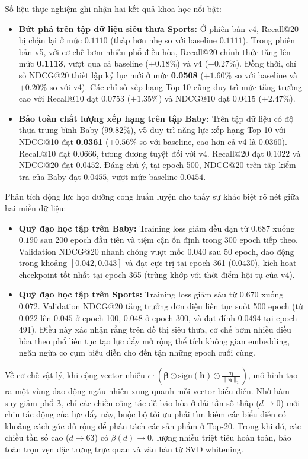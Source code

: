 Số liệu thực nghiệm ghi nhận hai kết quả khoa học nổi bật:
\begin{itemize}
    \item \textbf{Bứt phá trên tập dữ liệu siêu thưa Sports:} Ở phiên bản v4, Recall@20 bị chặn lại ở mức $0.1110$ (thấp hơn nhẹ so với baseline $0.1111$). Trong phiên bản v5, với cơ chế bơm nhiễu phổ điều hòa, Recall@20 chính thức tăng lên mức \textbf{0.1113}, vượt qua cả baseline ($+0.18\%$) và v4 ($+0.27\%$). Đồng thời, chỉ số NDCG@20 thiết lập kỷ lục mới ở mức \textbf{0.0508} ($+1.60\%$ so với baseline và $+0.20\%$ so với v4). Các chỉ số xếp hạng Top-10 cũng duy trì mức tăng trưởng cao với Recall@10 đạt $0.0753$ ($+1.35\%$) và NDCG@10 đạt $0.0415$ ($+2.47\%$).
    \item \textbf{Bảo toàn chất lượng xếp hạng trên tập Baby:} Trên tập dữ liệu có độ thưa trung bình Baby ($99.82\%$), v5 duy trì năng lực xếp hạng Top-10 với NDCG@10 đạt \textbf{0.0361} ($+0.56\%$ so với baseline, cao hơn cả v4 là $0.0360$). Recall@10 đạt $0.0666$, tương đương tuyệt đối với v4. Recall@20 đạt $0.1022$ và NDCG@20 đạt $0.0452$. Đáng chú ý, tại epoch 500, NDCG@20 trên tập kiểm tra của Baby đạt $0.0455$, vượt mức baseline $0.0454$.
\end{itemize}

Phân tích động lực học đường cong huấn luyện cho thấy sự khác biệt rõ nét giữa hai miền dữ liệu:
\begin{itemize}
    \item \textbf{Quỹ đạo học tập trên Baby:} Training loss giảm đều đặn từ $0.687$ xuống $0.190$ sau 200 epoch đầu tiên và tiệm cận ổn định trong 300 epoch tiếp theo. Validation NDCG@20 nhanh chóng vượt mốc $0.040$ sau 50 epoch, dao động trong khoảng $[0.042, 0.043]$ và đạt cực trị tại epoch 361 ($0.0430$), kích hoạt checkpoint tốt nhất tại epoch 365 (trùng khớp với thời điểm hội tụ của v4).
    \item \textbf{Quỹ đạo học tập trên Sports:} Training loss giảm sâu từ $0.670$ xuống $0.072$. Validation NDCG@20 tăng trưởng đơn điệu liên tục suốt 500 epoch (từ $0.022$ lên $0.045$ ở epoch 100, $0.048$ ở epoch 300, và đạt đỉnh $0.0494$ tại epoch 491). Điều này xác nhận rằng trên đồ thị siêu thưa, cơ chế bơm nhiễu điều hòa theo phổ liên tục tạo lực đẩy mở rộng thể tích không gian embedding, ngăn ngừa co cụm biểu diễn cho đến tận những epoch cuối cùng.
\end{itemize}

Về cơ chế vật lý, khi cộng vector nhiễu $\epsilon \cdot \left( \boldsymbol{\beta} \odot \text{sign}(\mathbf{h}) \odot \frac{\boldsymbol{\eta}}{\|\boldsymbol{\eta}\|_2} \right)$, mô hình tạo ra một vùng dao động ngẫu nhiên xung quanh mỗi vector biểu diễn. Nhờ hàm suy giảm phổ $\boldsymbol{\beta}$, chỉ các chiều cộng tác dễ bão hòa ở dải tần số thấp ($d \to 0$) mới chịu tác động của lực đẩy này, buộc bộ tối ưu phải tìm kiếm các biểu diễn có khoảng cách góc đủ rộng để phân tách các sản phẩm ở Top-20. Trong khi đó, các chiều tần số cao ($d \to 63$) có $\beta(d) \to 0$, lượng nhiễu triệt tiêu hoàn toàn, bảo toàn trọn vẹn đặc trưng trực quan và văn bản từ SVD whitening.

